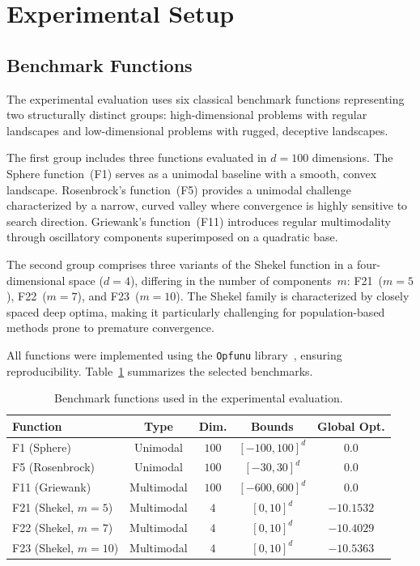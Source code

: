 \section{Experimental Setup}
\label{sec:experimental_setup}

\subsection{Benchmark Functions}
\label{subsec:benchmarks}

The experimental evaluation uses six classical benchmark functions representing two structurally distinct groups: high-dimensional problems with regular landscapes and low-dimensional problems with rugged, deceptive landscapes.

The first group includes three functions evaluated in $d = 100$ dimensions. The Sphere function~(F1) serves as a unimodal baseline with a smooth, convex landscape. Rosenbrock's function~(F5) provides a unimodal challenge characterized by a narrow, curved valley where convergence is highly sensitive to search direction. Griewank's function~(F11) introduces regular multimodality through oscillatory components superimposed on a quadratic base.

The second group comprises three variants of the Shekel function in a four-dimensional space ($d = 4$), differing in the number of components~$m$: F21~($m{=}5$), F22~($m{=}7$), and F23~($m{=}10$). The Shekel family is characterized by closely spaced deep optima, making it particularly challenging for population-based methods prone to premature convergence.

All functions were implemented using the \texttt{Opfunu} library~\cite{Van_Thieu_2024_Opfunu}, ensuring reproducibility. Table~\ref{tab:benchmark_functions} summarizes the selected benchmarks.

\begin{table}[!ht]
    \caption{Benchmark functions used in the experimental evaluation.}
    \label{tab:benchmark_functions}
    \centering
    \begin{tabular}{lcccc}
    \toprule
    Function & Type & Dim. & Bounds & Global Opt. \\
    \midrule
    F1 (Sphere)            & Unimodal   & $100$ & $[-100, 100]^d$ & $0.0$ \\
    F5 (Rosenbrock)        & Unimodal   & $100$ & $[-30, 30]^d$   & $0.0$ \\
    F11 (Griewank)         & Multimodal & $100$ & $[-600, 600]^d$ & $0.0$ \\
    F21 (Shekel, $m{=}5$)  & Multimodal & $4$   & $[0, 10]^d$     & $-10.1532$ \\
    F22 (Shekel, $m{=}7$)  & Multimodal & $4$   & $[0, 10]^d$     & $-10.4029$ \\
    F23 (Shekel, $m{=}10$) & Multimodal & $4$   & $[0, 10]^d$     & $-10.5363$ \\
    \bottomrule
    \end{tabular}
\end{table}

